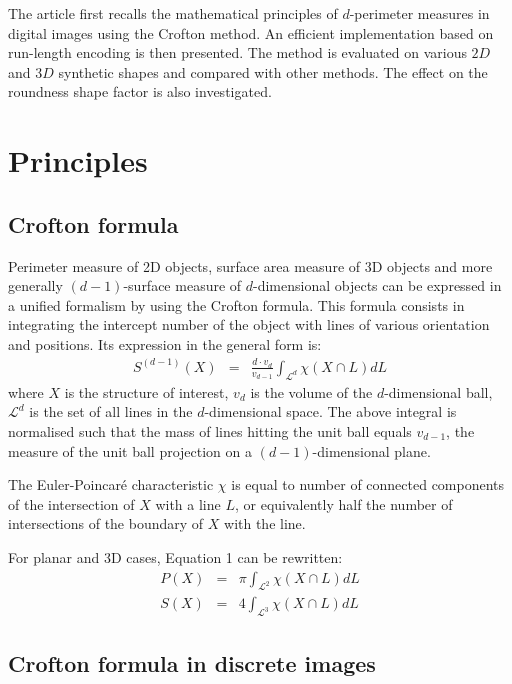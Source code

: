\documentclass{InsightArticle}
\begin{document}
The article first recalls the mathematical principles of $d$-perimeter measures in digital images
using the Crofton method. An efficient implementation based on run-length encoding is then presented.
The method is evaluated on various $2D$ and $3D$ synthetic shapes and compared with other methods.
The effect on the roundness shape factor is also investigated.


\section{Principles}
\subsection{Crofton formula}

Perimeter measure of 2D objects, surface area measure of 3D objects 
and more generally $(d-1)$-surface measure of $d$-dimensional objects 
can be expressed in a unified formalism by using the Crofton formula.
This formula consists in integrating the intercept number of the object with
lines of various orientation and positions. Its expression in
the general form is:
\begin{eqnarray}
S^{(d-1)}(X) & = & \frac{d \cdot v_d}{v_{d-1}}\int_{\mathcal{L}^d}\chi\left(X\cap L\right) dL
\end{eqnarray}
where $X$ is the structure of interest, $v_d$ is the volume of the $d$-dimensional ball,
$\mathcal{L}^d$ is the set of all lines in the $d$-dimensional space. 
The above integral is normalised such that the mass of lines hitting the unit ball 
equals $v_{d-1}$, the measure of the unit ball projection on a $(d-1)$-dimensional plane.

The Euler-Poincar\'e characteristic $\chi$ is equal to number of connected components
of the intersection of $X$ with a line $L$, or equivalently half the number of intersections
of the boundary of $X$ with the line.

For planar and 3D cases, Equation 1 can be rewritten:
\begin{eqnarray}
P(X) & = & \pi \int_{\mathcal{L}^2} \chi \left( X \cap L \right) dL \\
S(X) & = &  4  \int_{\mathcal{L}^3} \chi \left( X \cap L \right) dL
\end{eqnarray}

\subsection{Crofton formula in discrete images}
\end{document}
